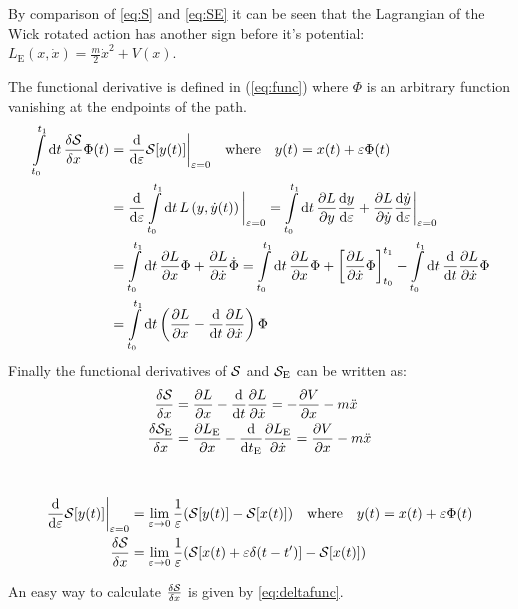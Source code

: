 \noindent By comparison of \cref{eq:S} and \cref{eq:SE} it can be seen that the Lagrangian of the Wick rotated action has another sign before it's potential: $L_\mathrm{E}(x,\dot{x})=\frac{m}{2} \dot{x}^2+V(x)$.

\noindent The functional derivative is defined in (\ref{eq:func}) where $\Phi$ is an arbitrary function vanishing at the endpoints of the path.
\begin{align}{}
    \int\limits_{t_0}^{t_1} \dd{t} \fdv{\action}{x} \Phi (t) &= \dv{\varepsilon} \action [y(t)]\bigg|_{\varepsilon = 0}\quad \text{where} \quad y(t) = x(t) + \varepsilon \Phi(t) \label{eq:func}\\
    &= \dv{\varepsilon} \int\limits_{t_0}^{t_1}\dd{t}L\left(y, \dot{y}(t)\right)\bigg|_{\varepsilon = 0} = \int\limits_{t_0}^{t_1}\dd{t}\pdv{L}{y}\dv{y}{\varepsilon} + \pdv{L}{\dot{y}}\dv{\dot{y}}{\varepsilon}\bigg|_{\varepsilon = 0}\\
    &= \int\limits_{t_0}^{t_1}\dd{t}\pdv{L}{x}\Phi + \pdv{L}{\dot{x}}\dot{\Phi} = \int\limits_{t_0}^{t_1}\dd{t}\pdv{L}{x}\Phi + \left[ \pdv{L}{\dot{x}} \Phi\right]_{t_0}^{t_1}- \int \limits_{t_0}^{t_1} \dd{t} \dv{t}\pdv{L}{\dot{x}}\Phi\\
    &= \int\limits_{t_0}^{t_1}\dd{t}\left( \pdv{L}{x} - \dv{t}\pdv{L}{\dot{x}} \right)\Phi
\end{align}
Finally the functional derivatives of $\mathcal{S}$ and $\mathcal{S}_\mathrm{E}$ can be written as:
\begin{align}{}
    \fdv{\action}{x}&= \pdv{L}{x} - \dv{t} \pdv{L}{\dot{x}} = - \pdv{V}{x} - m \ddot{x}\\
    \fdv{\action_\mathrm{E}}{x}&= \pdv{L_\mathrm{E}}{x} - \dv{t_\mathrm{E}} \pdv{L_\mathrm{E}}{\dot{x}} = \pdv{V}{x} - m \ddot{x}
\end{align}{}
\\

\begin{align}
    \dv{\varepsilon} \action [y(t)]\bigg|_{\varepsilon = 0} &= \lim_{\varepsilon \to 0} \frac{1}{\varepsilon}(\action[y(t)] - \action[x(t)])\quad \text{where} \quad y(t) = x(t) + \varepsilon \Phi(t)\\
    \fdv{\action}{x}&= \lim_{\varepsilon \to 0} \frac{1}{\varepsilon}(\action[x(t) + \varepsilon \delta (t-t')] - \action[x(t)])\label{eq:deltafunc}
\end{align}{}

An easy way to calculate $\fdv{\action}{x}$ is given by \cref{eq:deltafunc}.


